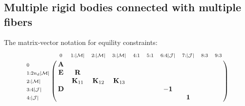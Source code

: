 \documentclass[a4paper,10pt]{article}
\begin{document}
\subsection{Multiple rigid bodies connected with multiple fibers}
The matrix-vector notation for equility constraints:
\begin{equation}\notag
\bordermatrix{
                                        & \scriptstyle{0      }        &   \scriptstyle{1 : |\mathcal{M}|}           &  \scriptstyle{2 : |\mathcal{M}|}           & \scriptstyle{3 : |\mathcal{M}|}            &  \scriptstyle{4 : 1}    & \scriptstyle{5 : 1}    &  \scriptstyle{6:4| \mathcal{J} | }  &  \scriptstyle{7 : | \mathcal{J} |}     &  \scriptstyle{8 : 3} &  \scriptstyle{9:3} \cr
\scriptstyle{0      }                   &\mathbf{A}                    &                                             &                                            &                                            &                         &                        &                                     &                                        &                      &                    \cr
\scriptstyle{1 : 2n_d|\mathcal{M}|}     &\mathbf{E}                    &   \mathbf{R}                                &                                            &                                            &                         &                        &                                     &                                        &                      &                    \cr
\scriptstyle{2 : |\mathcal{M}|}         &                              &   \mathbf{K}_{11}                           &  \mathbf{K}_{12}                           & \mathbf{K}_{13}                            &                         &                        &                                     &                                        &                      &                    \cr
\scriptstyle{3 : 4| \mathcal{J} | }     &\mathbf{D}                    &                                             &                                            &                                            &                         &                        &  -\mathbf{1}                        &                                        &                      &                    \cr
\scriptstyle{4 : | \mathcal{J} | }      &                              &                                             &                                            &                                            &                         &                        &                                     &  \mathbf{1}                            &                      &                    \cr
}
\end{equation}
\end{document}
